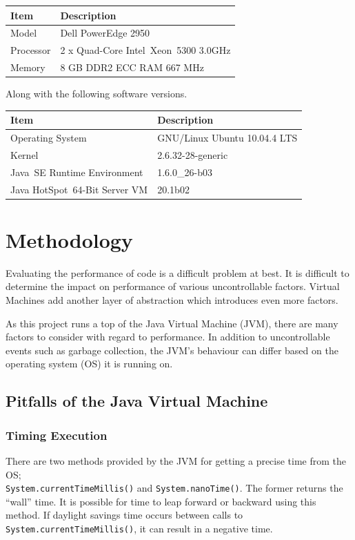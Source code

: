 \documentclass[12pt,letterpaper,oneside]{report}
\theoremstyle{definition}
\begin{document}
			\begin{table}[!ht]
				\centering
				\begin{tabular}{ll}
					\toprule
					Item & Description \\
					\midrule
					Model & Dell PowerEdge 2950 \\
					Processor & 2 x Quad-Core Intel\textregistered\ Xeon\texttrademark\ 5300 3.0GHz \\
					Memory & 8 GB DDR2 ECC RAM 667 MHz \\
					\bottomrule
				\end{tabular}
			\end{table}
			
			Along with the following software versions.
			
			\begin{table}[!ht]
				\centering
				\begin{tabular}{ll}
					\toprule
					Item & Description \\
					\midrule
					Operating System & GNU/Linux Ubuntu 10.04.4 LTS \\
					Kernel & 2.6.32-28-generic \\
					Java\texttrademark\ SE Runtime Environment & 1.6.0\_26-b03 \\
					Java HotSpot\texttrademark\ 64-Bit Server VM & 20.1\-b02 \\
					\bottomrule
				\end{tabular}
			\end{table}
		
		\section{Methodology}
			Evaluating the performance of code is a difficult problem at best.  It is difficult to determine the impact on performance of various uncontrollable factors.  Virtual Machines add another layer of abstraction which introduces even more factors.
			
			As this project runs a top of the Java Virtual Machine (JVM), there are many factors to consider with regard to performance.  In addition to uncontrollable events such as garbage collection, the JVM's behaviour can differ based on the operating system (OS) it is running on.
			
			\subsection{Pitfalls of the Java Virtual Machine}
				\subsubsection{Timing Execution}
					There are two methods provided by the JVM for getting a precise time from the OS; \\\texttt{System.currentTimeMillis()} and \texttt{System.nanoTime()}.  The former returns the ``wall'' time.  It is possible for time to leap forward or backward using this method.  If daylight savings time occurs between calls to \texttt{System.currentTimeMillis()}, it can result in a negative time.
					
\end{document}
